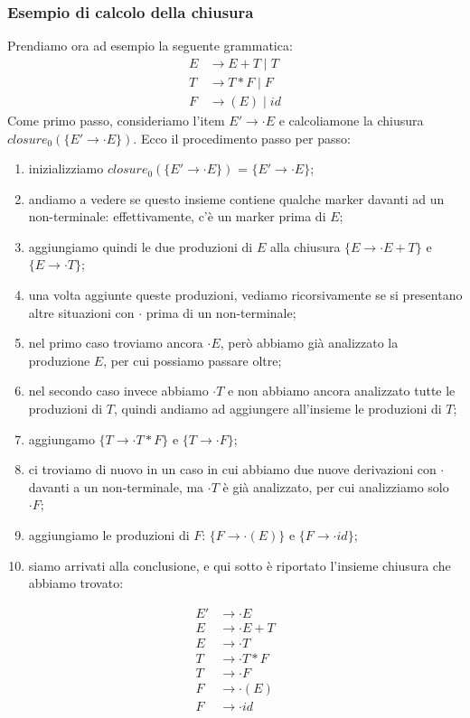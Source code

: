 \documentclass[class=book, crop=false, oneside, 12pt]{standalone}
\begin{document}
\subsubsection{Esempio di calcolo della chiusura}
Prendiamo ora ad esempio la seguente grammatica:
\begin{align*}
    E &\to E+T \mid T\\
    T &\to T*F \mid F\\
    F &\to (E) \mid id
\end{align*}
Come primo passo, consideriamo l'item \(E' \to \cdot E\) e calcoliamone la chiusura \(closure_0(\{E' \to \cdot E\})\). Ecco il procedimento passo per passo:
\begin{enumerate}
    \item inizializziamo \(closure_0(\{E' \to \cdot E\})\) = \(\{E' \to \cdot E\}\); 
    \item andiamo a vedere se questo insieme contiene qualche marker davanti ad un non-terminale: effettivamente, c'è un marker prima di \(E\);
    \item aggiungiamo quindi le due produzioni di \(E\) alla chiusura \(\{E \to \cdot E+T\}\) e \(\{E \to \cdot T\}\);
    \item una volta aggiunte queste produzioni, vediamo ricorsivamente se si presentano altre situazioni con \(\cdot\) prima di un non-terminale;
    \item nel primo caso troviamo ancora \(\cdot E\), però abbiamo già analizzato la produzione \(E\), per cui possiamo passare oltre;
    \item nel secondo caso invece abbiamo \(\cdot T\) e non abbiamo ancora analizzato tutte le produzioni di \(T\), quindi andiamo ad aggiungere all'insieme le produzioni di \(T\);
    \item aggiungamo \(\{T \to \cdot T * F\}\) e \(\{T \to \cdot F\}\);
    \item ci troviamo di nuovo in un caso in cui abbiamo due nuove derivazioni con \(\cdot\) davanti
    a un non-terminale, ma \(\cdot T\) è già analizzato, per cui analizziamo solo \(\cdot F\);
    \item aggiungiamo le produzioni di \(F\): \(\{F \to \cdot (E)\}\) e \(\{F \to \cdot id \}\);
    \item siamo arrivati alla conclusione, e qui sotto è riportato l'insieme chiusura che abbiamo trovato:
\end{enumerate}
\begin{align*}
    E' &\to \cdot E \\
    E  &\to \cdot E+T \\
    E  &\to \cdot T \\
    T  &\to \cdot T * F \\
    T  &\to \cdot F \\
    F  &\to \cdot (E) \\
    F  &\to \cdot id
\end{align*}
\end{document}
